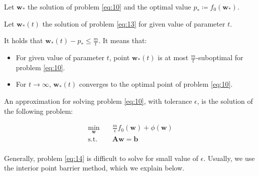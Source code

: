 \documentclass{beamer}
\begin{document}
\begin{frame}

\justifying
Let $\mathbf{w}_{*}$ the solution of problem \eqref{eq:10} and the optimal value $p_{*} \coloneqq f_{0}\left(\mathbf{w}_{*}\right)$.

\vspace{0.4cm}
\justifying
Let $\mathbf{w}_{*}\left(t\right)$ the solution of problem \eqref{eq:13} for given value of parameter $t$.

\vspace{0.4cm}
\justifying
It holds that $\mathbf{w}_{*}\left(t\right) - p_{*} \leq \frac{m}{t}$. It means that:
\begin{itemize}
	\item For given value of parameter $t$, point $\mathbf{w}_{*}\left(t\right)$ is at most $\frac{m}{t}$-suboptimal for problem \eqref{eq:10}.
	\item For $t \rightarrow \infty$, $\mathbf{w}_{*}\left(t\right)$ converges to the optimal point of problem \eqref{eq:10}.
\end{itemize}

\vspace{0.4cm}
\justifying
An approximation for solving problem \eqref{eq:10}, with tolerance $\epsilon$, is the solution of the following problem:

\justifying
\begin{equation}
\begin{aligned}
\label{eq:14}
\min_{\mathbf{w}} \quad & {\frac{m}{\epsilon} f_{0}\left(\mathbf{w}\right) + \phi\left(\mathbf{w}\right)} \\
\textrm{s.t.} \quad & \mathbf{A}\mathbf{w} = \mathbf{b} \\
\end{aligned}
\end{equation}

\vspace{0.4cm}
\justifying
Generally, problem \eqref{eq:14} is difficult to solve for small value of $\epsilon$. Usually, we use the interior point barrier method, which we explain below.

\end{frame}
\end{document}
